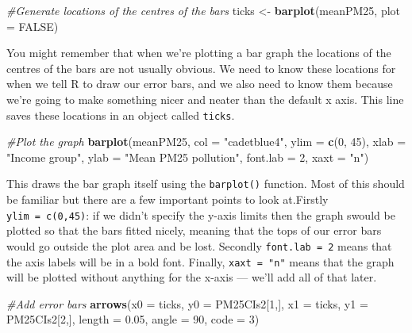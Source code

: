 \documentclass[
]{book}
\newenvironment{Shaded}{\begin{snugshade}}{\end{snugshade}}
\newcommand{\CommentTok}[1]{\textcolor[rgb]{0.56,0.35,0.01}{\textit{#1}}}
\newcommand{\DataTypeTok}[1]{\textcolor[rgb]{0.13,0.29,0.53}{#1}}
\newcommand{\DecValTok}[1]{\textcolor[rgb]{0.00,0.00,0.81}{#1}}
\newcommand{\FloatTok}[1]{\textcolor[rgb]{0.00,0.00,0.81}{#1}}
\newcommand{\KeywordTok}[1]{\textcolor[rgb]{0.13,0.29,0.53}{\textbf{#1}}}
\newcommand{\NormalTok}[1]{#1}
\newcommand{\OtherTok}[1]{\textcolor[rgb]{0.56,0.35,0.01}{#1}}
\newcommand{\StringTok}[1]{\textcolor[rgb]{0.31,0.60,0.02}{#1}}
\begin{document}
\begin{Shaded}
\begin{Highlighting}[]
\CommentTok{#Generate locations of the centres of the bars}
\NormalTok{ticks <-}\StringTok{ }\KeywordTok{barplot}\NormalTok{(meanPM25, }\DataTypeTok{plot =} \OtherTok{FALSE}\NormalTok{)}
\end{Highlighting}
\end{Shaded}

You might remember that when we're plotting a bar graph the locations of the centres of the bars are not usually obvious. We need to know these locations for when we tell R to draw our error bars, and we also need to know them because we're going to make something nicer and neater than the default x axis. This line saves these locations in an object called \texttt{ticks}.

\begin{Shaded}
\begin{Highlighting}[]
\CommentTok{#Plot the graph}
\KeywordTok{barplot}\NormalTok{(meanPM25,}
        \DataTypeTok{col =} \StringTok{"cadetblue4"}\NormalTok{,}
        \DataTypeTok{ylim =} \KeywordTok{c}\NormalTok{(}\DecValTok{0}\NormalTok{, }\DecValTok{45}\NormalTok{),}
        \DataTypeTok{xlab =} \StringTok{"Income group"}\NormalTok{,}
        \DataTypeTok{ylab =} \StringTok{"Mean PM25 pollution"}\NormalTok{,}
        \DataTypeTok{font.lab =} \DecValTok{2}\NormalTok{,}
        \DataTypeTok{xaxt =} \StringTok{"n"}\NormalTok{)}
\end{Highlighting}
\end{Shaded}

This draws the bar graph itself using the \texttt{barplot()} function. Most of this should be familiar but there are a few important points to look at.Firstly \texttt{ylim\ =\ c(0,45)}: if we didn't specify the y-axis limits then the graph swould be plotted so that the bars fitted nicely, meaning that the tops of our error bars would go outside the plot area and be lost. Secondly \texttt{font.lab\ =\ 2} means that the axis labels will be in a bold font. Finally, \texttt{xaxt\ =\ "n"} means that the graph will be plotted without anything for the x-axis --- we'll add all of that later.

\begin{Shaded}
\begin{Highlighting}[]
\CommentTok{#Add error bars}
\KeywordTok{arrows}\NormalTok{(}\DataTypeTok{x0 =}\NormalTok{ ticks, }
       \DataTypeTok{y0 =}\NormalTok{ PM25CIs2[}\DecValTok{1}\NormalTok{,], }
       \DataTypeTok{x1 =}\NormalTok{ ticks, }
       \DataTypeTok{y1 =}\NormalTok{ PM25CIs2[}\DecValTok{2}\NormalTok{,],}
       \DataTypeTok{length =} \FloatTok{0.05}\NormalTok{,}
       \DataTypeTok{angle =} \DecValTok{90}\NormalTok{,}
       \DataTypeTok{code =} \DecValTok{3}\NormalTok{)}
\end{Highlighting}
\end{Shaded}
\end{document}
